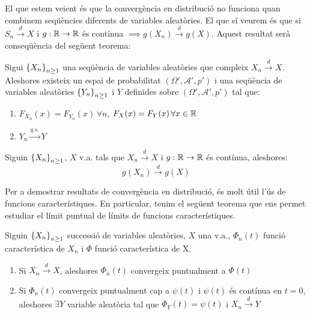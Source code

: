 El que estem veient és que la convergència en distribució no funciona quan combinem seqüències diferents de
variables aleatòries. El que sí veurem és que si $S_n \overset{d}{\to} X$ i $g:\mathbb{R} \to \mathbb{R}$ és contínua
$\implies g(X_n) \overset{d}{\to} g(X)$. Aquest resultat serà conseqüència del següent teorema:

\begin{thm}
  Sigui $\left\{X_n\right\}_{n\geq1}$ una seqüència de variables aleatòries que compleix $X_n \overset{d}{\to} X$.
  Aleshores existeix un espai de probabilitat $(\Omega', \mathcal{A}', p')$ i una seqüència 
  de variables aleatòries $\left\{Y_n\right\}_{n\geq1}$ i $Y$ definides sobre $(\Omega', \mathcal{A}', p')$ tal que:
  
  \begin{enumerate}
      \item $F_{X_n}(x) = F_{Y_n}(x) \, \forall n$, $F_X(x) = F_Y(x) \, \forall x \in \mathbb{R}$
      \item $Y_n \overset{q.s.}{\to} Y$
  \end{enumerate}
\end{thm}

\begin{col}
  Siguin $\left\{X_n\right\}_{n\geq1}$, $X$ v.a. tals que $X_n \overset{d}{\to} X$ i $g: \mathbb{R} \to \mathbb{R}$ és
  contínua, aleshores:
  \[
    g(X_n) \overset{d}{\to} g(X)
  \]
\end{col}

Per a demostrar resultats de convergència en distribució, és molt útil l'ús de funcions característiques.
En particular, tenim el següent teorema que ens permet estudiar el límit puntual de límits de funcions característiques.

\begin{thm}
  Siguin $\left\{X_n\right\}_{n\geq1}$ successió de variables aleatòries, $X$ una v.a., $\Phi_n(t)$ 
  funció característica de $X_n$ i $\Phi$ funció característica de X.
  
  \begin{enumerate}
      \item Si $X_n \overset{d}{\to} X$, aleshores $\Phi_n(t)$ convergeix puntualment a $\Phi(t)$
      \item Si $\Phi_n(t)$ convergeix puntualment cap a $\psi(t)$ i $\psi(t)$ és contínua en $t=0$, 
      aleshores $\exists Y$ variable aleatòria tal que $\Phi_Y(t) = \psi(t)$ i $X_n \overset{d}{\to} Y$
  \end{enumerate}
  
\end{thm}

